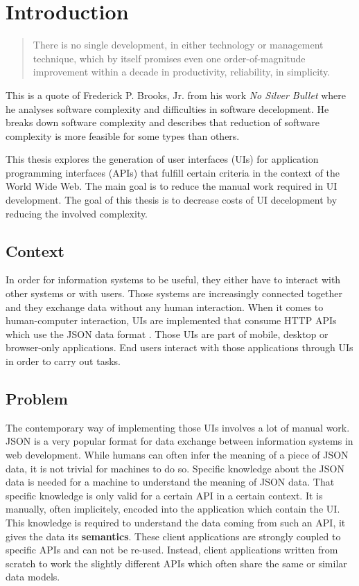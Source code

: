 \section{Introduction}\label{introduction}

\begin{quotation}
There is no single development, in either technology or management technique, which by itself promises even one order-of-magnitude improvement within a decade in productivity, reliability, in simplicity.
\end{quotation}

This is a quote of Frederick P. Brooks, Jr. from his work \textit{No Silver Bullet} \citep{nosilverbullet} where he analyses software complexity and difficulties in software decelopment. He breaks down software complexity and describes that reduction of software complexity is more feasible for some types than others.

This thesis explores the generation of user interfaces (UIs) for application programming interfaces (APIs) that fulfill certain criteria in the context of the World Wide Web. The main goal is to reduce the manual work required in UI development. The goal of this thesis is to decrease costs of UI decelopment by reducing the involved complexity.

\subsection{Context}\label{context}
In order for information systems to be useful, they either have to interact with other systems or with users. Those systems are increasingly connected together and they exchange data without any human interaction. When it comes to human-computer interaction, UIs are implemented that consume HTTP APIs which use the JSON data format \citep{jsonformat}. Those UIs are part of mobile, desktop or browser-only applications. End users interact with those applications through UIs in order to carry out tasks.

\subsection{Problem}\label{problem}
The contemporary way of implementing those UIs involves a lot of manual work. JSON is a very popular format for data exchange between information systems in web development. While humans can often infer the meaning of a piece of JSON data, it is not trivial for machines to do so. Specific knowledge about the JSON data is needed for a machine to understand the meaning of JSON data. That specific knowledge is only valid for a certain API in a certain context. It is manually, often implicitely, encoded into the application which contain the UI. This knowledge is required to understand the data coming from such an API, it gives the data its \textbf{semantics}. These client applications are strongly coupled to specific APIs and can not be re-used. Instead, client applications written from scratch to work the slightly different APIs which often share the same or similar data models.

